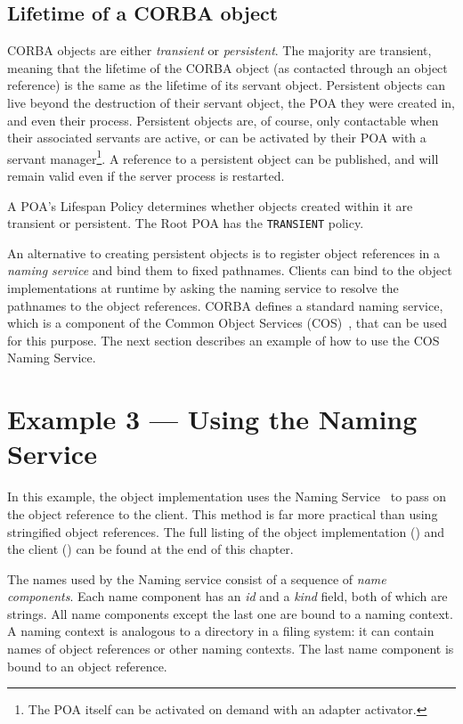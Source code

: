 \documentclass[11pt,twoside,a4paper]{book}
\newcommand{\code}[1]{\texttt{#1}}
\newcommand{\term}[1]{\textit{#1}}
\newcommand{\file}{\begingroup \urlstyle{tt}\Url}
\begin{document}
\subsection{Lifetime of a CORBA object}

CORBA objects are either \term{transient} or \term{persistent}. The
majority are transient, meaning that the lifetime of the CORBA object
(as contacted through an object reference) is the same as the lifetime
of its servant object. Persistent objects can live beyond the
destruction of their servant object, the POA they were created in, and
even their process. Persistent objects are, of course, only
contactable when their associated servants are active, or can be
activated by their POA with a servant manager\footnote{The POA itself
can be activated on demand with an adapter activator.}. A reference to
a persistent object can be published, and will remain valid even if
the server process is restarted.

A POA's Lifespan Policy determines whether objects created within it
are transient or persistent. The Root POA has the \code{TRANSIENT}
policy.

An alternative to creating persistent objects is to register object
references in a \term{naming service} and bind them to fixed
pathnames. Clients can bind to the object implementations at runtime
by asking the naming service to resolve the pathnames to the object
references. CORBA defines a standard naming service, which is a
component of the Common Object Services (COS)~\cite{corbaservices},
that can be used for this purpose. The next section describes an
example of how to use the COS Naming Service.

\section{Example 3 --- Using the Naming Service}

In this example, the object implementation uses the Naming
Service~\cite{corbaservices} to pass on the object reference to the
client.  This method is far more practical than using stringified
object references. The full listing of the object implementation
(\file{eg3_impl.cc}) and the client (\file{eg3_clt.cc}) can be found
at the end of this chapter.

The names used by the Naming service consist of a sequence of
\term{name components}. Each name component has an \term{id} and a
\term{kind} field, both of which are strings. All name components
except the last one are bound to a naming context. A naming context is
analogous to a directory in a filing system: it can contain names of
object references or other naming contexts. The last name component is
bound to an object reference.
\end{document}
